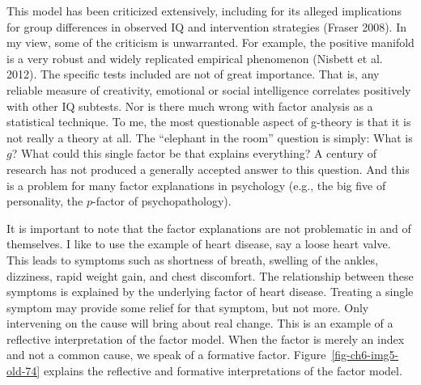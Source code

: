 \documentclass[
  a4paper,
  DIV=11,
  numbers=noendperiod,
  oneside]{scrreprt}
\begin{document}
This model has been criticized extensively, including for its alleged
implications for group differences in observed IQ and intervention
strategies (Fraser 2008). In my view, some of the criticism is
unwarranted. For example, the positive manifold is a very robust and
widely replicated empirical phenomenon (Nisbett et al. 2012). The
specific tests included are not of great importance. That is, any
reliable measure of creativity, emotional or social intelligence
correlates positively with other IQ subtests. Nor is there much wrong
with factor analysis as a statistical technique. To me, the most
questionable aspect of g-theory is that it is not really a theory at
all. The ``elephant in the room'' question is simply: What is \(g\)?
What could this single factor be that explains everything? A century of
research has not produced a generally accepted answer to this question.
And this is a problem for many factor explanations in psychology (e.g.,
the big five of personality, the \(p\)-factor of psychopathology).

It is important to note that the factor explanations are not problematic
in and of themselves. I like to use the example of heart disease, say a
loose heart valve. This leads to symptoms such as shortness of breath,
swelling of the ankles, dizziness, rapid weight gain, and chest
discomfort. The relationship between these symptoms is explained by the
underlying factor of heart disease. Treating a single symptom may
provide some relief for that symptom, but not more. Only intervening on
the cause will bring about real change. This is an example of a
reflective interpretation of the factor model. When the factor is merely
an index and not a common cause, we speak of a formative factor.
Figure~\ref{fig-ch6-img5-old-74} explains the reflective and formative
interpretations of the factor model.
\end{document}

